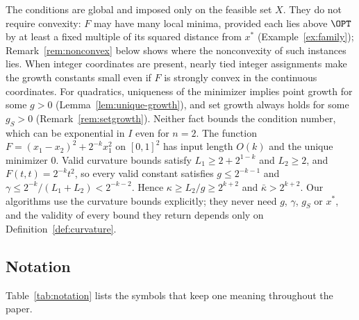 The conditions are global and imposed only on the feasible set $X$. They do
not require convexity: $F$ may have many local minima, provided each lies above
$\OPT$ by at least a fixed multiple of its squared distance from $x^*$
(Example~\ref{ex:family}); Remark~\ref{rem:nonconvex} below shows where the
nonconvexity of such instances lies. When integer coordinates are present,
nearly tied integer assignments make the growth constants small even if $F$ is
strongly convex in the continuous coordinates. For quadratics, uniqueness of
the minimizer implies point growth for some $g>0$
(Lemma~\ref{lem:unique-growth}), and set growth always holds for some $g_S>0$
(Remark~\ref{rem:setgrowth}). Neither fact bounds the condition number, which
can be exponential in $I$ even for $n=2$. The function
$F=(x_1-x_2)^2+2^{-k}x_1^2$ on $[0,1]^2$ has input length $O(k)$ and the
unique minimizer $0$. Valid curvature bounds satisfy $L_1\ge2+2^{1-k}$ and
$L_2\ge2$, and $F(t,t)=2^{-k}t^2$, so every valid constant satisfies
$g\le2^{-k-1}$ and $\gamma\le2^{-k}/(L_1+L_2)<2^{-k-2}$. Hence
$\kappa\ge L_2/g\ge2^{k+2}$ and $\bar\kappa>2^{k+2}$. Our
algorithms use the curvature bounds explicitly; they never need $g$, $\gamma$,
$g_S$ or $x^*$, and the validity of every bound they return depends only on
Definition~\ref{def:curvature}.


\subsection{Notation}
Table~\ref{tab:notation} lists the symbols that keep one meaning throughout
the paper.


